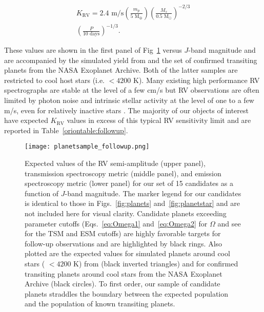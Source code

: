 \begin{multline}
  K_{\text{RV}} = 2.4 \text{ m/s} \left( \frac{m_p}{5 \text{ M}_{\oplus}} \right)
  \left( \frac{M_s}{0.5 \text{ M}_{\odot}} \right)^{-2/3} \\
  \left( \frac{P}{10\text{ days}} \right)^{-1/3}.
\end{multline}

\noindent These values are shown in the first panel of Fig~\ref{fig:followup} versus $J$-band magnitude
and are accompanied by the simulated \tess{} yield from \cite{barclay18} and the set of
confirmed transiting planets from the NASA Exoplanet Archive.
Both of the latter samples are restricted to cool host stars (i.e. \teff{}
$<4200$ K). Many existing high performance RV spectrographs are stable at the level of a few cm/s but
RV observations are often limited by photon noise and intrinsic stellar activity at the level of one to a few
m/s, even for relatively inactive stars \citep{fischer16}. 
The majority of our objects of interest have expected $K_{\text{RV}}$ values in excess of this typical RV
sensitivity limit and are reported in Table~\ref{oriontable:followup}.  \\



\begin{figure}
  \centering
  \texttt{[image: planetsample\_followup.png]}
  \caption{Expected values of the RV semi-amplitude (upper panel), transmission spectroscopy metric (middle panel),
    and emission spectroscopy metric (lower panel) for our set of 15 candidates as a function of $J$-band
    magnitude. The marker legend for our candidates is identical to those in Figs.~\ref{fig:planets}
    and~\ref{fig:planetstar} and are not included here for visual clarity. Candidate planets
    exceeding parameter cutoffs (Eqs.~\ref{eq:Omega1} and~\ref{eq:Omega2} for $\Omega$ and see \citealt{kempton18} for
    the TSM and ESM cutoffs) are highly favorable targets for follow-up observations and are highlighted by black rings.
    Also plotted are the expected values for simulated \tess{} planets around cool stars (\teff{} $< 4200$ K) from
    \cite{barclay18} (black inverted triangles) and for confirmed transiting planets around cool stars from the NASA
    Exoplanet Archive (black circles). To first order, our sample of candidate planets straddles the boundary
    between the expected \tess{} population and the population of known transiting planets.}
  \label{fig:followup}
\end{figure}

